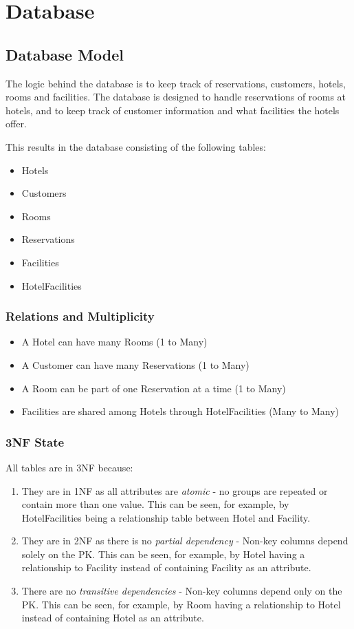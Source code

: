 \chapter{Database}
\label{chapter:the-database}

\section{Database Model}
The logic behind the database is to keep track of reservations, customers, hotels, rooms and facilities.
The database is designed to handle reservations of rooms at hotels, and to keep track of customer information and what facilities the hotels offer.

This results in the database consisting of the following tables:
\begin{itemize}
  \item Hotels
  \item Customers
  \item Rooms
  \item Reservations
  \item Facilities
  \item HotelFacilities
\end{itemize}

\subsection{Relations and Multiplicity}

\begin{itemize}
  \item A Hotel can have many Rooms (1 to Many)
  \item A Customer can have many Reservations (1 to Many)
  \item A Room can be part of one Reservation at a time (1 to Many)
  \item Facilities are shared among Hotels through HotelFacilities (Many to Many)
\end{itemize}

\subsection{3NF State}
All tables are in 3NF because:
\begin{enumerate}
  \item They are in 1NF as all attributes are \emph{atomic} - no groups are repeated or contain more than one value.
      This can be seen, for example, by HotelFacilities being a relationship table between Hotel and Facility.
  \item They are in 2NF as there is no \emph{partial dependency} - Non-key columns depend solely on the PK.
      This can be seen, for example, by Hotel having a relationship to Facility instead of containing Facility as an attribute.
  \item There are no \emph{transitive dependencies} - Non-key columns depend only on the PK.
      This can be seen, for example, by Room having a relationship to Hotel instead of containing Hotel as an attribute.
\end{enumerate}